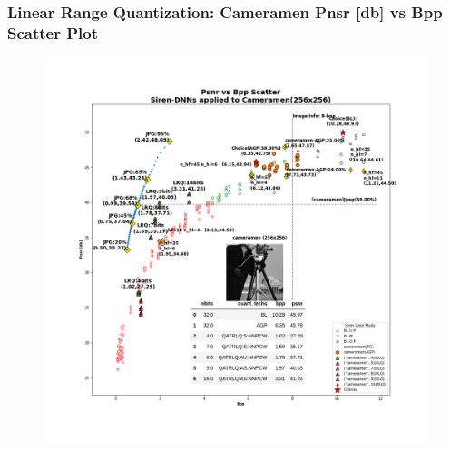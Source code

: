 



\begin{frame}
    \frametitle{Linear Range Quantization: Cameramen Pnsr [db] vs Bpp Scatter Plot}

    \begin{figure}
    \includegraphics[scale=0.22]{slides/experiments/quant_dataset/images/cameramen_jpeg_quanted_siren_1.png}
    \end{figure}

\end{frame}

